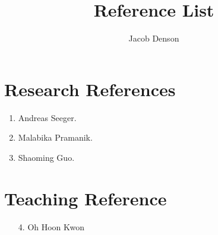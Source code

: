 \documentclass[11pt]{article}
\title{\vspace{-2em}Reference List}
\author{Jacob Denson}
\date{}
\begin{document}
\maketitle

\section*{Research References}

\begin{enumerate}
    \item Andreas Seeger.
    \item Malabika Pramanik.
    \item Shaoming Guo.
\end{enumerate}

\section*{Teaching Reference}

\begin{enumerate}
    \item[4.]{Oh Hoon Kwon}
\end{enumerate}
\end{document}
